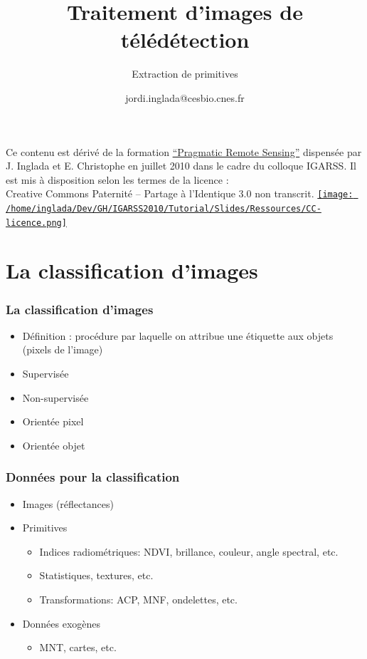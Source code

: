 \documentclass[compress,handout]{beamer}
\title{Traitement d'images de télédétection}
\subtitle{Extraction de primitives}
\author
{jordi.inglada@cesbio.cnes.fr}
\institute[Cesbio] %
{\textsc{Centre d'Études Spatiales de la Biosphère, Toulouse, France}}
\date{}
\begin{document}
\begin{frame}
  \titlepage
  \begin{center}
{\tiny Ce contenu est dérivé de la formation \href{http://www.orfeo-toolbox.org/packages/PragmaticRemoteSensing-handout.pdf}{``Pragmatic Remote
  Sensing''} dispensée par J. Inglada et E. Christophe en juillet 2010
  dans le cadre du colloque IGARSS. Il est mis à disposition selon les termes de la licence :\\
Creative Commons Paternité – Partage à l’Identique 3.0 non transcrit.} \href{http://creativecommons.org/licenses/by-sa/3.0/}{\texttt{[image: /home/inglada/Dev/GH/IGARSS2010/Tutorial/Slides/Ressources/CC-licence.png]}}    
  \end{center}
\end{frame}


\section[Intro]{La classification d'images}
\begin{frame}
\frametitle{La classification d'images}
  \begin{itemize}
  \item Définition : procédure par laquelle on attribue une étiquette
    aux objets (pixels de l'image)
  \item Supervisée
  \item Non-supervisée
  \item Orientée pixel
  \item Orientée objet
  \end{itemize}
\end{frame}

\begin{frame}
  \frametitle{Données pour la classification}
  \begin{itemize}
  \item Images (réflectances)
  \item Primitives
    \begin{itemize}
    \item Indices radiométriques: NDVI, brillance, couleur, angle
      spectral, etc.
    \item Statistiques, textures, etc.
    \item Transformations: ACP, MNF, ondelettes, etc.
    \end{itemize}
  \item Données exogènes
    \begin{itemize}
    \item MNT, cartes, etc.
    \end{itemize}
  \end{itemize}
\end{frame}
\end{document}
